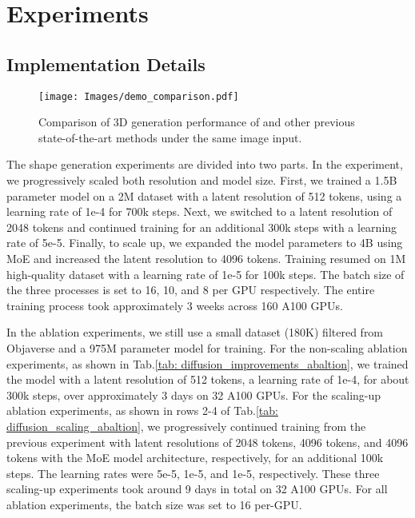 \section{Experiments}

\subsection{Implementation Details}\label{sec:Implementation_detail}

\begin{figure*}[!t]
    \centering
    \texttt{[image: Images/demo\_comparison.pdf]}
    \vspace{-2.5em}
    \caption{Comparison of 3D generation performance of \method{} and other previous state-of-the-art methods under the same image input.}
    \label{fig:demo_comparison}
    \vspace{-1em}
\end{figure*}


The shape generation experiments are divided into two parts.
In the \method{} experiment, we progressively scaled both resolution and model size.
First, we trained a 1.5B parameter model on a 2M dataset with a latent resolution of 512 tokens, using a learning rate of 1e-4 for 700k steps. 
Next, we switched to a latent resolution of 2048 tokens and continued training for an additional 300k steps with a learning rate of 5e-5. 
Finally, to scale up, we expanded the model parameters to 4B using MoE and increased the latent resolution to 4096 tokens. 
Training resumed on 1M high-quality dataset with a learning rate of 1e-5 for 100k steps. 
The batch size of the three processes is set to 16, 10, and 8 per GPU respectively.
The entire training process took approximately 3 weeks across 160 A100 GPUs.

In the ablation experiments, 
we still use a small dataset (180K) filtered from Objaverse and a 975M parameter model for training. For the non-scaling ablation experiments, as shown in Tab.\ref{tab: diffusion_improvements_abaltion}, we trained the model with a latent resolution of 512 tokens, a learning rate of 1e-4, for about 300k steps, over approximately 3 days on 32 A100 GPUs. For the scaling-up ablation experiments, as shown in rows 2-4 of Tab.\ref{tab: diffusion_scaling_abaltion}, we progressively continued training from the previous experiment with latent resolutions of 2048 tokens, 4096 tokens, and 4096 tokens with the MoE model architecture, respectively, for an additional 100k steps. The learning rates were 5e-5, 1e-5, and 1e-5, respectively. These three scaling-up experiments took around 9 days in total on 32 A100 GPUs. For all ablation experiments, the batch size was set to 16 per-GPU.

